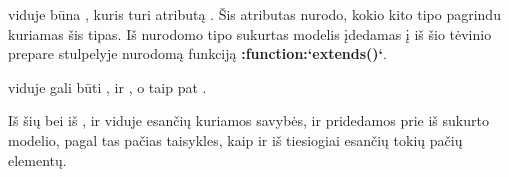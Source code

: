 \documentclass[letterpaper,10pt,lithuanian]{sphinxmanual}
\begin{document}
\sphinxAtStartPar
{} viduje būna {\hyperref[\detokenize{schemos/xsd:xsd-extension}]{}}, kuris turi atributą {\hyperref[\detokenize{schemos/xsd:xsd-base}]{}}.
Šis atributas nurodo, kokio kito tipo pagrindu kuriamas šis tipas. Iš {\hyperref[\detokenize{schemos/xsd:xsd-base}]{}} nurodomo
tipo sukurtas modelis įdedamas į iš šio  tėvinio  prepare
stulpelyje nurodomą funkciją {\color{red}\bfseries{}:function:`extends()`}.

\sphinxAtStartPar
{\hyperref[\detokenize{schemos/xsd:xsd-extension}]{}} viduje
gali būti {\hyperref[\detokenize{schemos/xsd:xsd-sequence}]{}}, {\hyperref[\detokenize{schemos/xsd:xsd-choice}]{}} ir {\hyperref[\detokenize{schemos/xsd:xsd-all}]{}}, o taip pat {\hyperref[\detokenize{schemos/xsd:xsd-attribute}]{}}.

\sphinxAtStartPar
Iš šių {\hyperref[\detokenize{schemos/xsd:xsd-attribute}]{}} bei iš {\hyperref[\detokenize{schemos/xsd:xsd-sequence}]{}}, {\hyperref[\detokenize{schemos/xsd:xsd-choice}]{}} ir {\hyperref[\detokenize{schemos/xsd:xsd-all}]{}} viduje
esančių {\hyperref[\detokenize{schemos/xsd:xsd-element}]{}} kuriamos savybės, ir pridedamos prie iš {\hyperref[\detokenize{schemos/xsd:xsd-complextype}]{}} sukurto
modelio, pagal tas pačias taisykles, kaip ir iš tiesiogiai {\hyperref[\detokenize{schemos/xsd:xsd-complextype}]{}} esančių tokių
pačių elementų.
\end{document}
